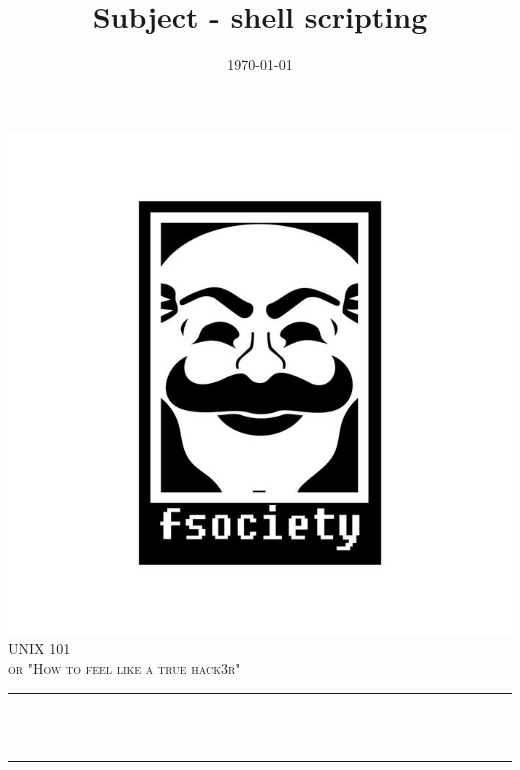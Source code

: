 \documentclass[12pt]{article}
\title{Subject - shell scripting}								%
\date{\today}											%
\makeatletter
\let\thetitle\@title
\let\thedate\@date
\makeatother
\begin{document}

\begin{titlepage}
	\centering
    \vspace*{0.5 cm}
    \includegraphics[scale = 0.3]{resources/logo4.png}\\[1.0 cm]
    \textsc{\LARGE \newline\newline UNIX 101}\\[2.0 cm]
	\textsc{\Large or "How to feel like a true hack3r"}\\[0.5 cm]
	\rule{\linewidth}{0.2 mm} \\[0.4 cm]
	{ \huge \bfseries \thetitle}\\
	\rule{\linewidth}{0.2 mm} \\[1.5 cm]
	
    \thedate
    
    
    
	
\end{titlepage}


\tableofcontents
\pagebreak

\end{document}
